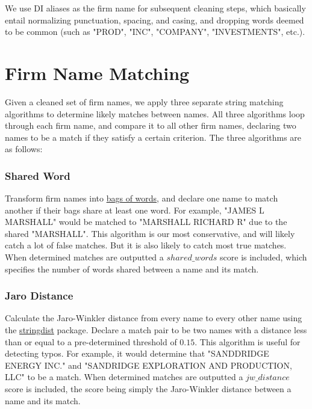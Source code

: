 \documentclass{article}
\begin{document}
We use DI aliases as the firm name for subsequent cleaning steps, which basically entail normalizing punctuation, spacing, and casing, and dropping words deemed to be common (such as "PROD", "INC", "COMPANY", "INVESTMENTS", etc.). 

\section{Firm Name Matching}
\label{sec:matching}

Given a cleaned set of firm names, we apply three separate string matching algorithms to determine likely matches between names. All three algorithms loop through each firm name, and compare it to all other firm names, declaring two names to be a match if they satisfy a certain criterion. The three algorithms are as follows:
\subsubsection{Shared Word}
Transform firm names into \href{https://en.wikipedia.org/wiki/Bag-of-words_model}{bags of words}, and declare one name to match another if their bags share at least one word. For example, "JAMES L MARSHALL" would be matched to "MARSHALL RICHARD R" due to the shared "MARSHALL". This algorithm is our most conservative, and will likely catch a lot of false matches. But it is also likely to catch most true matches. When determined matches are outputted a $shared\_words$ score is included, which specifies the number of words shared between a name and its match. 
\subsubsection{Jaro Distance}
Calculate the Jaro-Winkler distance from every name to every other name using the \href{https://cran.r-project.org/web/packages/stringdist/stringdist.pdf}{stringdist} package. Declare a match pair to be two names with a distance less than or equal to a pre-determined threshold of $0.15$. This algorithm is useful for detecting typos. For example, it would determine that "SANDDRIDGE ENERGY INC." and "SANDRIDGE EXPLORATION AND PRODUCTION, LLC" to be a match. When determined matches are outputted a $jw\_distance$ score is included, the score being simply the Jaro-Winkler distance between a name and its match. 
\end{document}
